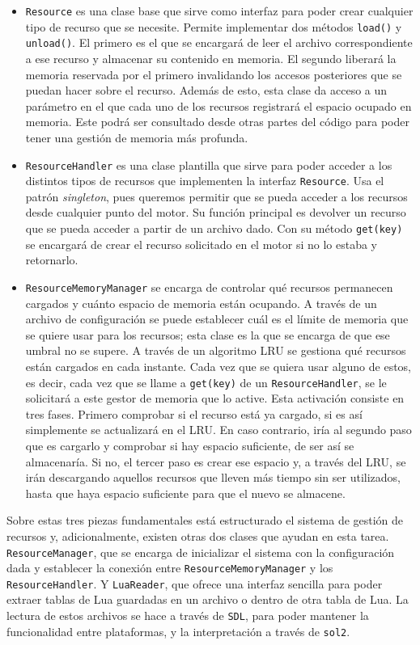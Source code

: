 \begin{itemize}
	\item \texttt{Resource} es una clase base que sirve como interfaz para poder crear cualquier tipo de recurso que se necesite. Permite implementar dos métodos \texttt{load()} y \texttt{unload()}. El primero es el que se encargará de leer el archivo correspondiente a ese recurso y almacenar su contenido en memoria. El segundo liberará la memoria reservada por el primero invalidando los accesos posteriores que se puedan hacer sobre el recurso. Además de esto, esta clase da acceso a un parámetro en el que cada uno de los recursos registrará el espacio ocupado en memoria. Este podrá ser consultado desde otras partes del código para poder tener una gestión de memoria más profunda.
	\item \texttt{ResourceHandler} es una clase plantilla que sirve para poder acceder a los distintos tipos de recursos que implementen la interfaz \texttt{Resource}. Usa el patrón \textit{singleton}, pues queremos permitir que se pueda acceder a los recursos desde cualquier punto del motor. Su función principal es devolver un recurso que se pueda acceder a partir de un archivo dado. Con su método \texttt{get(key)} se encargará de crear el recurso solicitado en el motor si no lo estaba y retornarlo. 
	\item \texttt{ResourceMemoryManager} se encarga de controlar qué recursos permanecen cargados y cuánto espacio de memoria están ocupando. A través de un archivo de configuración se puede establecer cuál es el límite de memoria que se quiere usar para los recursos; esta clase es la que se encarga de que ese umbral no se supere. A través de un algoritmo LRU se gestiona qué recursos están cargados en cada instante. Cada vez que se quiera usar alguno de estos, es decir, cada vez que se llame a \texttt{get(key)} de un \texttt{ResourceHandler}, se le solicitará a este gestor de memoria que lo active. Esta activación consiste en tres fases. Primero comprobar si el recurso está ya cargado, si es así simplemente se actualizará en el LRU. En caso contrario, iría al segundo paso que es cargarlo y comprobar si hay espacio suficiente, de ser así se almacenaría. Si no, el tercer paso es crear ese espacio y, a través del LRU, se irán descargando aquellos recursos que lleven más tiempo sin ser utilizados, hasta que haya espacio suficiente para que el nuevo se almacene.
\end{itemize}

\medskip

Sobre estas tres piezas fundamentales está estructurado el sistema de gestión de recursos y, adicionalmente, existen otras dos clases que ayudan en esta tarea. \texttt{ResourceManager}, que se encarga de inicializar el sistema con la configuración dada y establecer la conexión entre \texttt{ResourceMemoryManager} y los \texttt{ResourceHandler}. Y \texttt{LuaReader}, que ofrece una interfaz sencilla para poder extraer tablas de Lua guardadas en un archivo o dentro de otra tabla de Lua. La lectura de estos archivos se hace a través de \texttt{SDL}, para poder mantener la funcionalidad entre plataformas, y la interpretación a través de \texttt{sol2}.

